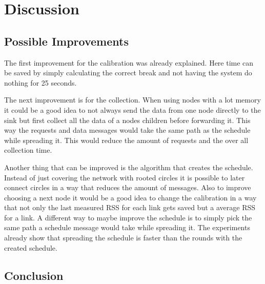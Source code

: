 \chapter{Discussion}



\section{Possible Improvements}
The first improvement for the calibration was already explained. Here time can be saved by simply calculating the correct break and not having the system do nothing for 25 seconds.

The next improvement is for the collection. When using nodes with a lot memory it could be a good idea to not always send the data from one node directly to the sink but first collect all the data of a nodes children before forwarding it. This way the requests and data messages would take the same path as the schedule while spreading it. This would reduce the amount of requests and the over all collection time.
 
Another thing that can be improved is the algorithm that creates the schedule. Instead of just covering the network with rooted circles it is possible to later connect circles in a way that reduces the amount of messages. Also to improve choosing a next node it would be a good idea to change the calibration in a way that not only the last measured RSS for each link gets saved but a average RSS for a link.
A different way to maybe improve the schedule is to simply pick the same path a schedule message would take while spreading it. The experiments already show that spreading the schedule is faster than the rounds with the created schedule. 

\section{Conclusion}